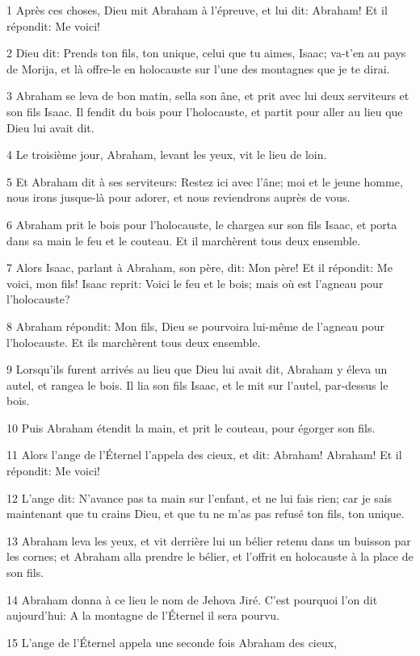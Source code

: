 \par 1 Après ces choses, Dieu mit Abraham à l'épreuve, et lui dit: Abraham! Et il répondit: Me voici!
\par 2 Dieu dit: Prends ton fils, ton unique, celui que tu aimes, Isaac; va-t'en au pays de Morija, et là offre-le en holocauste sur l'une des montagnes que je te dirai.
\par 3 Abraham se leva de bon matin, sella son âne, et prit avec lui deux serviteurs et son fils Isaac. Il fendit du bois pour l'holocauste, et partit pour aller au lieu que Dieu lui avait dit.
\par 4 Le troisième jour, Abraham, levant les yeux, vit le lieu de loin.
\par 5 Et Abraham dit à ses serviteurs: Restez ici avec l'âne; moi et le jeune homme, nous irons jusque-là pour adorer, et nous reviendrons auprès de vous.
\par 6 Abraham prit le bois pour l'holocauste, le chargea sur son fils Isaac, et porta dans sa main le feu et le couteau. Et il marchèrent tous deux ensemble.
\par 7 Alors Isaac, parlant à Abraham, son père, dit: Mon père! Et il répondit: Me voici, mon fils! Isaac reprit: Voici le feu et le bois; mais où est l'agneau pour l'holocauste?
\par 8 Abraham répondit: Mon fils, Dieu se pourvoira lui-même de l'agneau pour l'holocauste. Et ils marchèrent tous deux ensemble.
\par 9 Lorsqu'ils furent arrivés au lieu que Dieu lui avait dit, Abraham y éleva un autel, et rangea le bois. Il lia son fils Isaac, et le mit sur l'autel, par-dessus le bois.
\par 10 Puis Abraham étendit la main, et prit le couteau, pour égorger son fils.
\par 11 Alors l'ange de l'Éternel l'appela des cieux, et dit: Abraham! Abraham! Et il répondit: Me voici!
\par 12 L'ange dit: N'avance pas ta main sur l'enfant, et ne lui fais rien; car je sais maintenant que tu crains Dieu, et que tu ne m'as pas refusé ton fils, ton unique.
\par 13 Abraham leva les yeux, et vit derrière lui un bélier retenu dans un buisson par les cornes; et Abraham alla prendre le bélier, et l'offrit en holocauste à la place de son fils.
\par 14 Abraham donna à ce lieu le nom de Jehova Jiré. C'est pourquoi l'on dit aujourd'hui: A la montagne de l'Éternel il sera pourvu.
\par 15 L'ange de l'Éternel appela une seconde fois Abraham des cieux,
